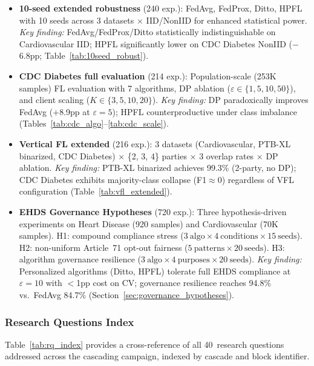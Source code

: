 \documentclass[conference]{IEEEtran}
\begin{document}
\begin{itemize}
    \item \textbf{10-seed extended robustness} (240 exp.): FedAvg, FedProx, Ditto, HPFL with 10 seeds across 3 datasets $\times$ IID/NonIID for enhanced statistical power. \textit{Key finding:} FedAvg/FedProx/Ditto statistically indistinguishable on Cardiovascular IID; HPFL significantly lower on CDC Diabetes NonIID ($-$6.8pp; Table~\ref{tab:10seed_robust}).
    \item \textbf{CDC Diabetes full evaluation} (214 exp.): Population-scale (253K samples) FL evaluation with 7 algorithms, DP ablation ($\varepsilon{\in}\{1, 5, 10, 50\}$), and client scaling ($K{\in}\{3, 5, 10, 20\}$). \textit{Key finding:} DP paradoxically improves FedAvg ($+$8.9pp at $\varepsilon{=}5$); HPFL counterproductive under class imbalance (Tables~\ref{tab:cdc_algo}--\ref{tab:cdc_scale}).
    \item \textbf{Vertical FL extended} (216 exp.): 3 datasets (Cardiovascular, PTB-XL binarized, CDC Diabetes) $\times$ \{2, 3, 4\} parties $\times$ 3 overlap rates $\times$ DP ablation. \textit{Key finding:} PTB-XL binarized achieves 99.3\% (2-party, no DP); CDC Diabetes exhibits majority-class collapse (F1$\approx$0) regardless of VFL configuration (Table~\ref{tab:vfl_extended}).
    \item \textbf{EHDS Governance Hypotheses} (720 exp.): Three hypothesis-driven experiments on Heart Disease (920 samples) and Cardiovascular (70K samples). H1: compound compliance stress ($3~\text{algo} \times 4~\text{conditions} \times 15~\text{seeds}$). H2: non-uniform Article~71 opt-out fairness ($5~\text{patterns} \times 20~\text{seeds}$). H3: algorithm governance resilience ($3~\text{algo} \times 4~\text{purposes} \times 20~\text{seeds}$). \textit{Key finding:} Personalized algorithms (Ditto, HPFL) tolerate full EHDS compliance at $\varepsilon{=}10$ with $<$1pp cost on CV; governance resilience reaches 94.8\% vs.\ FedAvg 84.7\% (Section~\ref{sec:governance_hypotheses}).
\end{itemize}

\subsubsection{Research Questions Index}

Table~\ref{tab:rq_index} provides a cross-reference of all 40~research questions addressed across the cascading campaign, indexed by cascade and block identifier.
\end{document}
